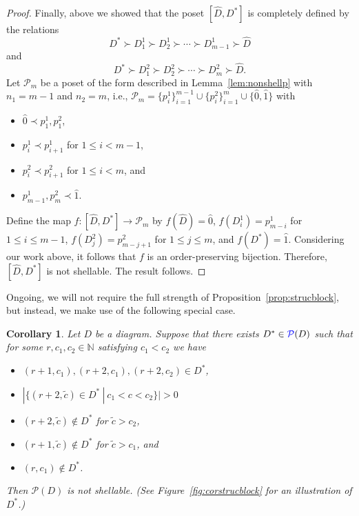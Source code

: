 \documentclass[letterpaper,10pt]{article}
\newtheorem{corollary}[theorem]{Corollary}
\newcommand{\bl}[1]{{\color{blue} #1}}
\begin{document}
\begin{proof}
Finally, above we showed that the poset $[\widehat{D},D^*]$ is completely defined by the relations $$D^* \succ D^1_1  \succ 
    D^1_2 \succ \cdots \succ D^1_{m-1} \succ \widehat{D}$$ and $$D^* \succ D_1^2  \succ 
    D_2^2 \succ \cdots \succ D_{m}^2 \succ \widehat{D}.$$ Let $\mathcal{P}_m$ be a poset of the form described in Lemma~\ref{lem:nonshellp} with $n_1=m-1$ and $n_2=m$, i.e., $\mathcal{P}_m=\{p_i^1\}_{i=1}^{m-1}\cup\{p_i^2\}_{i=1}^{m}\cup\{\hat{0},\hat{1}\}$ with 
\begin{itemize}
    \item $\hat{0}\prec p_1^1,p^2_1$,
    \item $p_i^1\prec p_{i+1}^1$ for $1\le i<m-1$,
    \item $p_i^2\prec p_{i+1}^2$ for $1\le i<m$, and
    \item $p_{m-1}^1,p_{m}^2\prec\hat{1}$.
\end{itemize}
Define the map $f:[\widehat{D},D^*]\to\mathcal{P}_m$ by $f(\widehat{D})=\hat{0}$, $f(D^1_i)=p_{m-i}^1$ for $1\le i\le m-1$, $f(D_j^2)=p_{m-j+1}^2$ for $1\le j\le m$, and $f(D^*)=\hat{1}$. Considering our work above, it follows that $f$ is an order-preserving bijection. Therefore, $[\widehat{D},D^*]$ is not shellable. The result follows.
\end{proof}

Ongoing, we will not require the full strength of Proposition~\ref{prop:strucblock}, but instead, we make use of the following special case.

\begin{corollary}\label{cor:strucblock}
    Let $D$ be a diagram. Suppose that there exists $D^*\in \bl{\mathcal{P}}(D)$ such that for some $r,c_1,c_2\in\mathbb{N}$ satisfying $c_1<c_2$ we have
    \begin{itemize}
        \item[\textup{(i)}] $(r+1,c_1),(r+2,c_1),(r+2,c_2)\in D^*$,
        \item[\textup{(ii)}] $|\{(r+2,\tilde{c})\in D^*~|~c_1<c<c_2\}|>0$
        \item[\textup{(iii)}] $(r+2,\tilde{c})\notin D^*$ for $\tilde{c}>c_2$,
        \item[\textup{(iv)}] $(r+1,\tilde{c})\notin D^*$ for $\tilde{c}>c_1$, and
        \item[\textup{(v)}] $(r,c_1)\notin D^*$.
    \end{itemize}
     Then $\mathcal{P}(D)$ is not shellable. \textup(See Figure~\ref{fig:corstrucblock} for an illustration of $D^*$.\textup)
\end{corollary}
\end{document}

